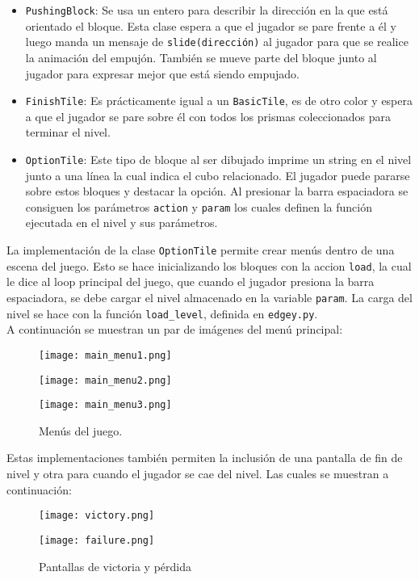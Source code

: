 \documentclass[letterpaper,11pt]{article} %
\begin{document}
\begin{itemize}
\begin{itemize}
			\item \verb!PushingBlock!:
			Se usa un entero para describir la dirección en la que está orientado el bloque. Esta clase espera a que el jugador se pare frente a él y luego manda un mensaje de \verb!slide(dirección)! al jugador para que se realice la animación del empujón. También se mueve parte del bloque junto al jugador para expresar mejor que está siendo empujado.
			\item \verb!FinishTile!:
			Es prácticamente igual a un \verb!BasicTile!, es de otro color y espera a que el jugador se pare sobre él con todos los prismas coleccionados para terminar el nivel.
			\item \verb!OptionTile!:
			Este tipo de bloque al ser dibujado imprime un string en el nivel junto a una línea la cual indica el cubo relacionado. El jugador puede pararse sobre estos bloques y destacar la opción. Al presionar la barra espaciadora se consiguen los parámetros \verb!action! y \verb!param! los cuales definen la función ejecutada en el nivel y sus parámetros.
		\end{itemize}
	\end{itemize}

	La implementación de la clase \verb!OptionTile! permite crear menús dentro de una escena del juego. Esto se hace inicializando los bloques con la accion \verb!load!, la cual le dice al loop principal del juego, que cuando el jugador presiona la barra espaciadora, se debe cargar el nivel almacenado en la variable \verb!param!. La carga del nivel se hace con la función \verb!load_level!, definida en \verb!edgey.py!. \\
	A continuación se muestran un par de imágenes del menú principal:

	\begin{figure}[H]
		\begin{minipage}{0.3\textwidth}
			\centering
			\texttt{[image: main\_menu1.png]}
		\end{minipage}
		\begin{minipage}{0.3\textwidth}
			\centering
			\texttt{[image: main\_menu2.png]}
		\end{minipage}
		\begin{minipage}{0.3\textwidth}
			\centering
			\texttt{[image: main\_menu3.png]}
		\end{minipage}
		\caption{Menús del juego.}
	\end{figure}

	Estas implementaciones también permiten la inclusión de una pantalla de fin de nivel y otra para cuando el jugador se cae del nivel. Las cuales se muestran a continuación:
	\begin{figure}[h]
		\begin{minipage}{0.45\textwidth}
			\centering
			\texttt{[image: victory.png]}
		\end{minipage}
		\begin{minipage}{0.45\textwidth}
			\centering
			\texttt{[image: failure.png]}
		\end{minipage}
		\caption{Pantallas de victoria y pérdida}
	\end{figure}
\end{document}
